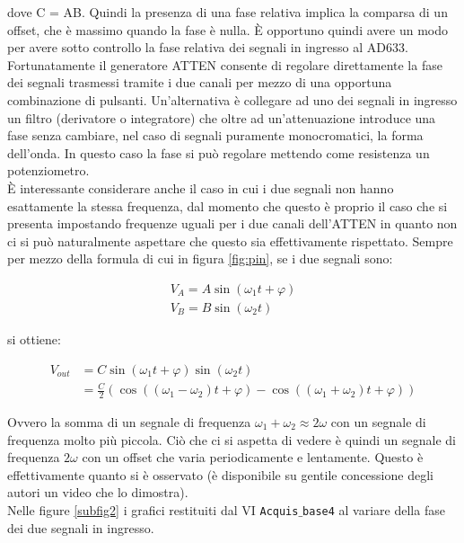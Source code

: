 \documentclass[a4paper]{article}
\begin{document}
dove C = AB. Quindi la presenza di una fase relativa implica la comparsa di un offset, che è massimo quando la fase è nulla. È opportuno quindi avere un modo per avere sotto controllo la fase relativa dei segnali in ingresso al AD633. Fortunatamente il generatore ATTEN consente di regolare direttamente la fase dei segnali trasmessi tramite i due canali per mezzo di una opportuna combinazione di pulsanti. Un'alternativa è collegare ad uno dei segnali in ingresso un filtro (derivatore o integratore) che oltre ad un'attenuazione introduce una fase senza cambiare, nel caso di segnali puramente monocromatici, la forma dell'onda. In questo caso la fase si può regolare mettendo come resistenza un potenziometro.\\
È interessante considerare anche il caso in cui i due segnali non hanno esattamente la stessa frequenza, dal momento che questo è proprio il caso che si presenta impostando frequenze uguali per i due canali dell'ATTEN in quanto non ci si può naturalmente aspettare che questo sia effettivamente rispettato. Sempre per mezzo della formula di cui in figura \ref{fig:pin}, se i due segnali sono:

\begin{gather}
V_A = A \sin (\omega _1 t + \varphi) \\
V_B = B \sin (\omega _2 t)
\end{gather}

si ottiene:

\begin{equation}
\begin{split}
V_{out} & = C \sin (\omega _1 t + \varphi) \sin (\omega  _2 t ) \\
		& = \frac{C}{2} ( \cos ((\omega _1 - \omega _2 ) t + \varphi) - \cos ((\omega _1 + \omega _2) t + \varphi))
\end{split}
\end{equation}

Ovvero la somma di un segnale di frequenza $\omega _1 + \omega _2 \approx 2 \omega$ con un segnale di frequenza molto più piccola. Ciò che ci si aspetta di vedere è quindi un segnale di frequenza $2 \omega$ con un offset che varia periodicamente e lentamente. Questo è effettivamente quanto si è osservato (è disponibile su gentile concessione degli autori un video che lo dimostra).\\ Nelle figure  \ref{subfig2} i grafici restituiti dal VI \texttt{Acquis$\_$base4} al variare della fase dei due segnali in ingresso.
\end{document}
